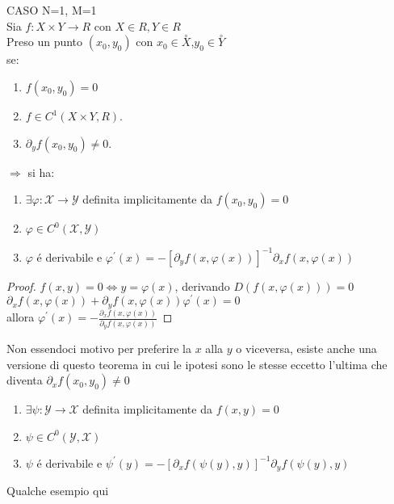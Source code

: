 \proposition CASO N=1, M=1\\
Sia $f:X\times Y\rightarrow R$ con $X\in R, Y\in R$\\
Preso un punto $(x_0,y_0)$ con $x_0\in \overset{\circ}{X}$,$y_0\in \overset{\circ}{Y}$\\
se:
\begin{enumerate}
	\item $f(x_0,y_0)=0$
	\item $f\in C^1(X\times Y,R)$.
	\item $\partial_yf(x_0,y_0)\ne 0$.
\end{enumerate}
$\Rightarrow $ si ha:\\
\begin{enumerate}
	\item $\exists \varphi: \mathcal{X}\rightarrow\mathcal{Y}$ definita implicitamente da $f(x_0,y_0)=0$
	\item $\varphi\in C^0(\mathcal{X},\mathcal{Y})$
	\item $\varphi$ \'e derivabile e $\varphi^{'}(x)=-[\partial_yf(x,\varphi(x))]^{-1}\partial_xf(x,\varphi(x))$
\end{enumerate}
\begin{proof}
	$f(x,y)=0\Leftrightarrow y=\varphi(x)$, derivando $D(f(x,\varphi(x)))=0$\\
	$\partial_xf(x,\varphi(x))+\partial_yf(x,\varphi(x))\varphi^{'}(x)=0$\\
	allora $\varphi^{'}(x) = -\frac{\partial_xf(x,\varphi(x))}{\partial_yf(x,\varphi(x))}$
\end{proof}
\observation Non essendoci motivo per preferire la $x$ alla $y$ o viceversa, esiste anche una versione di questo teorema  in  cui le ipotesi sono le stesse eccetto l'ultima che diventa $\partial_xf(x_0,y_0)\ne 0$
\begin{enumerate}
	\item $\exists \psi: \mathcal{Y}\rightarrow\mathcal{X}$ definita implicitamente da $f(x,y)=0$
	\item $\psi\in C^0(\mathcal{Y},\mathcal{X})$
	\item $\psi$ \'e derivabile e $\psi^{'}(y)=-[\partial_xf(\psi(y),y)]^{-1}\partial_yf(\psi(y),y)$
\end{enumerate}
Qualche esempio qui\\
